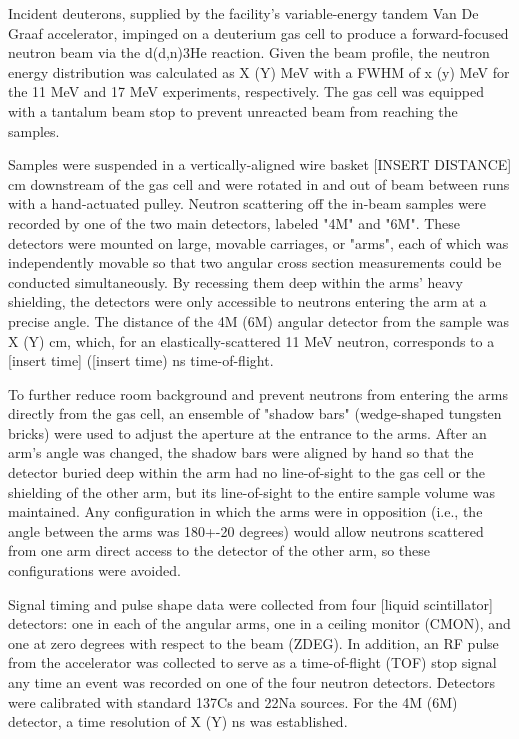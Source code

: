 Incident deuterons, supplied by the facility's variable-energy tandem
    Van De Graaf accelerator, impinged on a deuterium gas cell to produce a
forward-focused neutron beam via the d(d,n)3He reaction. Given the beam profile,
    the neutron energy distribution was calculated as X (Y) MeV with a FWHM of x (y)
    MeV for the 11 MeV and 17 MeV experiments, respectively. The gas cell was
    equipped with a tantalum beam stop to prevent unreacted beam from reaching
    the samples. 

    Samples were suspended in a vertically-aligned wire basket [INSERT DISTANCE] cm
    downstream of the gas cell and were rotated in and out of beam between
    runs with a hand-actuated pulley. Neutron scattering off
    the in-beam samples were recorded by one of the two main detectors, labeled "4M"
    and "6M". These detectors were mounted on large, movable carriages, or "arms",
    each of which was independently movable so that two angular cross section
    measurements could be conducted simultaneously. By recessing them deep within
    the arms' heavy shielding, the detectors were only accessible to neutrons
    entering the arm at a precise angle. The distance of the 4M (6M) angular
    detector from the sample was X (Y) cm, which, for an elastically-scattered
    11 MeV neutron, corresponds to a [insert time] ([insert time) ns time-of-flight.

    To further reduce room background and prevent neutrons from entering the arms directly
    from the gas cell, an ensemble of "shadow bars" (wedge-shaped tungsten bricks)
    were used to adjust the aperture at the entrance to the arms. After an arm's
    angle was changed, the shadow bars were aligned by hand so that the
    detector buried deep within the arm had no line-of-sight to the gas cell or the
    shielding of the other arm, but its line-of-sight to the entire sample volume was
    maintained. Any configuration in which the arms were in opposition (i.e., the
            angle between the arms was 180+-20 degrees) would allow neutrons scattered
    from one arm direct access to the detector of the other arm, so these
    configurations were avoided.

    Signal timing and pulse shape data were collected from four [liquid scintillator]
    detectors: one in each of the angular arms, one in a ceiling monitor
    (CMON), and one at zero degrees with respect to the beam (ZDEG). In addition,
    an RF pulse from the accelerator was collected to serve as a time-of-flight
    (TOF) stop signal any time an event was recorded on one of the four neutron
    detectors. Detectors were calibrated with standard 137Cs and 22Na sources. For
    the 4M (6M) detector, a time resolution of X (Y) ns was established.
